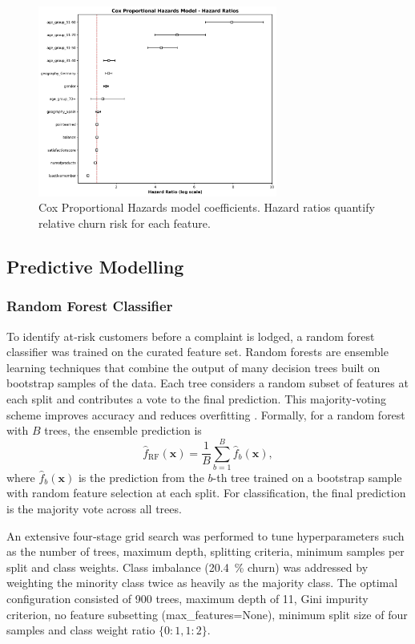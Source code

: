 \documentclass[12pt]{article}
\begin{document}
\begin{figure}[H]
\centering
\includegraphics[width=0.7\textwidth]{img/14_cox_ph_coefficients.png}
\caption{Cox Proportional Hazards model coefficients. Hazard ratios quantify relative churn risk for each feature.}
\label{fig:cox_coefficients}
\end{figure}

\subsection{Predictive Modelling}
\subsubsection{Random Forest Classifier}
To identify at‑risk customers before a complaint is lodged, a random forest classifier was trained on the curated feature set.  Random forests are ensemble learning techniques that combine the output of many decision trees built on bootstrap samples of the data.  Each tree considers a random subset of features at each split and contributes a vote to the final prediction.  This majority‑voting scheme improves accuracy and reduces overfitting \citep{geeksforgeeks_randomforest}.  Formally, for a random forest with \(B\) trees, the ensemble prediction is
\[ \hat{f}_{\text{RF}}(\mathbf{x}) = \frac{1}{B} \sum_{b=1}^{B} \hat{f}_b(\mathbf{x}), \]
where \(\hat{f}_b(\mathbf{x})\) is the prediction from the \(b\)-th tree trained on a bootstrap sample with random feature selection at each split.  For classification, the final prediction is the majority vote across all trees.

An extensive four‑stage grid search was performed to tune hyperparameters such as the number of trees, maximum depth, splitting criteria, minimum samples per split and class weights.  Class imbalance (20.4~\% churn) was addressed by weighting the minority class twice as heavily as the majority class.  The optimal configuration consisted of 900 trees, maximum depth of 11, Gini impurity criterion, no feature subsetting (max\_features=None), minimum split size of four samples and class weight ratio \(\{0:1,1:2\}\).
\end{document}

